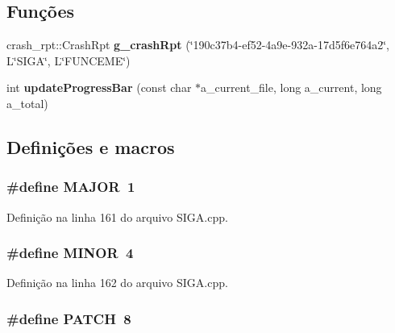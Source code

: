 \subsection*{Funções}
\begin{DoxyCompactItemize}
\item 
crash\+\_\+rpt\+::\+Crash\+Rpt {\bf g\+\_\+crash\+Rpt} (\char`\"{}190c37b4-\/ef52-\/4a9e-\/932a-\/17d5f6e764a2\char`\"{}, L\char`\"{}\+S\+I\+G\+A\char`\"{}, L\char`\"{}\+F\+U\+N\+C\+E\+M\+E\char`\"{})
\item 
int {\bf update\+Progress\+Bar} (const char $\ast$a\+\_\+current\+\_\+file, long a\+\_\+current, long a\+\_\+total)
\end{DoxyCompactItemize}


\subsection{Definições e macros}
\subsubsection[{M\+A\+J\+OR}]{\setlength{\rightskip}{0pt plus 5cm}\#define M\+A\+J\+OR~1}\label{_s_i_g_a_8cpp_a877cce34f3e58fd7f9194fab90724cb8}


Definição na linha 161 do arquivo S\+I\+G\+A.\+cpp.

\subsubsection[{M\+I\+N\+OR}]{\setlength{\rightskip}{0pt plus 5cm}\#define M\+I\+N\+OR~4}\label{_s_i_g_a_8cpp_a4e10915d93013542d442d78de0e02e9a}


Definição na linha 162 do arquivo S\+I\+G\+A.\+cpp.

\subsubsection[{P\+A\+T\+CH}]{\setlength{\rightskip}{0pt plus 5cm}\#define P\+A\+T\+CH~8}\label{_s_i_g_a_8cpp_af59c44c1f3ff875c35393428624473aa}


